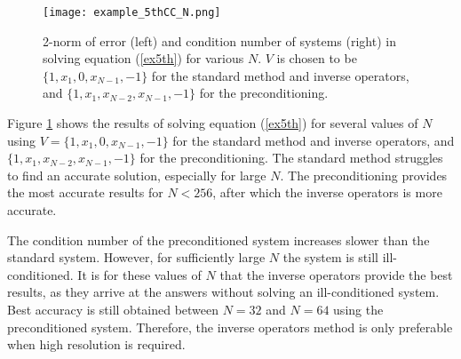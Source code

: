 \documentclass{sfuthesis}
\begin{document}
\begin{figure}
\texttt{[image: example\_5thCC\_N.png]}
\caption{2-norm of error (left) and condition number of systems (right) in solving equation (\ref{ex5th}) for various $N$. $V$ is chosen to be $\{ 1, x_1, 0, x_{N-1}, -1\}$ for the standard method and inverse operators, and $\{1, x_1, x_{N-2}, x_{N-1}, -1\}$ for the preconditioning.}
\label{fig:ex5thCC N}
\end{figure}

Figure \ref{fig:ex5thCC N} shows the results of solving equation (\ref{ex5th}) for several values of $N$ using $V = \{ 1, x_1, 0, x_{N-1}, -1\}$ for the standard method and inverse operators, and $\{1, x_1, x_{N-2}, x_{N-1}, -1\}$ for the preconditioning.
The standard method struggles to find an accurate solution, especially for large $N$.
The preconditioning provides the most accurate results for $N<256$, after which the inverse operators is more accurate.

The condition number of the preconditioned system increases slower than the standard system.
However, for sufficiently large $N$ the system is still ill-conditioned.
It is for these values of $N$ that the inverse operators provide the best results, as they arrive at the answers without solving an ill-conditioned system.
Best accuracy is still obtained between $N = 32$ and $N = 64$ using the preconditioned system.
Therefore, the inverse operators method is only preferable when high resolution is required.
\end{document}
